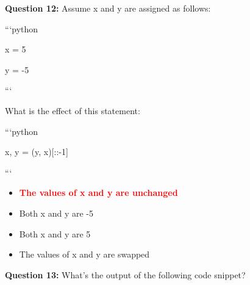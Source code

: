 \documentclass[12pt,a4paper]{article}
\begin{document}
\vspace{0.5cm}

\textbf{Question 12:} Assume x and y are assigned as follows:\newline

\newline
\newline

\newline
```python\newline

\newline
x = 5\newline

\newline
y = -5\newline

\newline
```\newline

\newline
\newline

\newline
What is the effect of this statement:\newline

\newline
\newline

\newline
```python\newline

\newline
x, y = (y, x)[::-1]\newline

\newline
```

\begin{itemize}
    \item[\textbf{A.}] \textcolor{red}{\textbf{The values of x and y are unchanged}}
    \item[\textbf{B.}] Both x and y are -5
    \item[\textbf{C.}] Both x and y are 5
    \item[\textbf{D.}] The values of x and y are swapped
\end{itemize}

\vspace{0.5cm}

\textbf{Question 13:} What's the output of the following code snippet?\newline
\end{document}
